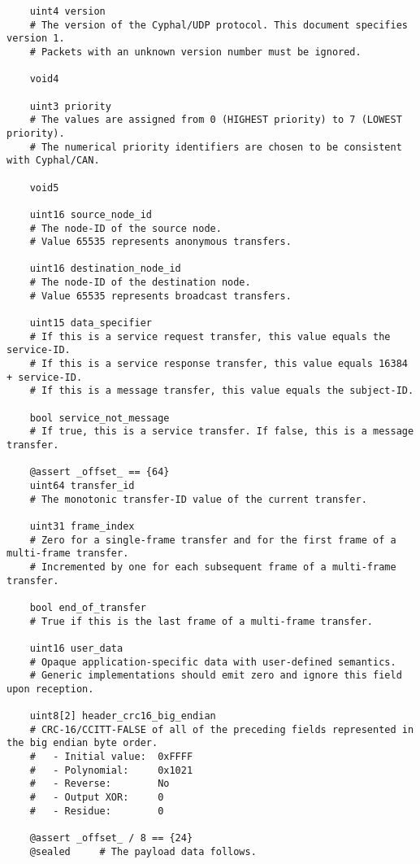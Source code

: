 \begin{samepage}
\begin{verbatim}
    uint4 version
    # The version of the Cyphal/UDP protocol. This document specifies version 1.
    # Packets with an unknown version number must be ignored.

    void4

    uint3 priority
    # The values are assigned from 0 (HIGHEST priority) to 7 (LOWEST priority).
    # The numerical priority identifiers are chosen to be consistent with Cyphal/CAN.

    void5

    uint16 source_node_id
    # The node-ID of the source node.
    # Value 65535 represents anonymous transfers.

    uint16 destination_node_id
    # The node-ID of the destination node.
    # Value 65535 represents broadcast transfers.

    uint15 data_specifier
    # If this is a service request transfer, this value equals the service-ID.
    # If this is a service response transfer, this value equals 16384 + service-ID.
    # If this is a message transfer, this value equals the subject-ID.

    bool service_not_message
    # If true, this is a service transfer. If false, this is a message transfer.

    @assert _offset_ == {64}
    uint64 transfer_id
    # The monotonic transfer-ID value of the current transfer.

    uint31 frame_index
    # Zero for a single-frame transfer and for the first frame of a multi-frame transfer.
    # Incremented by one for each subsequent frame of a multi-frame transfer.

    bool end_of_transfer
    # True if this is the last frame of a multi-frame transfer.

    uint16 user_data
    # Opaque application-specific data with user-defined semantics.
    # Generic implementations should emit zero and ignore this field upon reception.

    uint8[2] header_crc16_big_endian
    # CRC-16/CCITT-FALSE of all of the preceding fields represented in the big endian byte order.
    #   - Initial value:  0xFFFF
    #   - Polynomial:     0x1021
    #   - Reverse:        No
    #   - Output XOR:     0
    #   - Residue:        0

    @assert _offset_ / 8 == {24}
    @sealed     # The payload data follows.
\end{verbatim}
\end{samepage}

